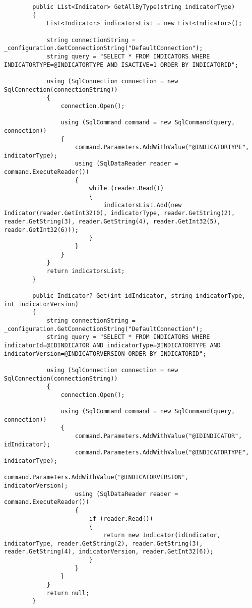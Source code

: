 \begin{itemize}
\begin{itemize}
\begin{lstlisting}
        public List<Indicator> GetAllByType(string indicatorType)
        {
            List<Indicator> indicatorsList = new List<Indicator>();

            string connectionString = _configuration.GetConnectionString("DefaultConnection");
            string query = "SELECT * FROM INDICATORS WHERE INDICATORTYPE=@INDICATORTYPE AND ISACTIVE=1 ORDER BY INDICATORID";

            using (SqlConnection connection = new SqlConnection(connectionString))
            {
                connection.Open();

                using (SqlCommand command = new SqlCommand(query, connection))
                {
                    command.Parameters.AddWithValue("@INDICATORTYPE", indicatorType);
                    using (SqlDataReader reader = command.ExecuteReader())
                    {
                        while (reader.Read())
                        {
                            indicatorsList.Add(new Indicator(reader.GetInt32(0), indicatorType, reader.GetString(2), reader.GetString(3), reader.GetString(4), reader.GetInt32(5), reader.GetInt32(6)));
                        }
                    }
                }
            }
            return indicatorsList;
        }

        public Indicator? Get(int idIndicator, string indicatorType, int indicatorVersion)
        {
            string connectionString = _configuration.GetConnectionString("DefaultConnection");
            string query = "SELECT * FROM INDICATORS WHERE indicatorId=@IDINDICATOR AND indicatorType=@INDICATORTYPE AND indicatorVersion=@INDICATORVERSION ORDER BY INDICATORID";

            using (SqlConnection connection = new SqlConnection(connectionString))
            {
                connection.Open();

                using (SqlCommand command = new SqlCommand(query, connection))
                {
                    command.Parameters.AddWithValue("@IDINDICATOR", idIndicator);
                    command.Parameters.AddWithValue("@INDICATORTYPE", indicatorType);
                    command.Parameters.AddWithValue("@INDICATORVERSION", indicatorVersion);
                    using (SqlDataReader reader = command.ExecuteReader())
                    {
                        if (reader.Read())
                        {
                            return new Indicator(idIndicator, indicatorType, reader.GetString(2), reader.GetString(3), reader.GetString(4), indicatorVersion, reader.GetInt32(6));
                        }
                    }
                }
            }
            return null;
        }


\end{lstlisting}
\end{itemize}
\end{itemize}
